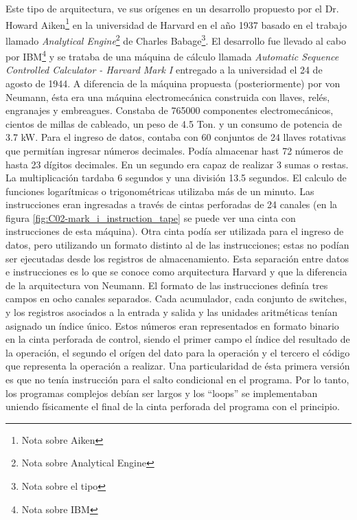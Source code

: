 Este tipo de arquitectura, ve sus orígenes en un desarrollo propuesto por el Dr. Howard Aiken\footnote{Nota sobre Aiken} en la universidad de Harvard en el año 1937 basado en el trabajo llamado \emph{Analytical Engine}\footnote{Nota sobre Analytical Engine} de Charles Babage\footnote{Nota sobre el tipo}. El desarrollo fue llevado al cabo por IBM\footnote{Nota sobre IBM} y se trataba de una máquina de cálculo llamada \emph{Automatic Sequence Controlled Calculator - Harvard Mark I} entregado a la universidad el 24 de agosto de 1944. A diferencia de la máquina propuesta (posteriormente) por von Neumann, ésta era una máquina electromecánica construida con llaves, relés, engranajes y embreagues. Constaba de 765000 componentes electromecánicos, cientos de millas de cableado, un peso de 4.5 Ton. y un consumo de potencia de 3.7 kW. Para el ingreso de datos, contaba con 60 conjuntos de 24 llaves rotativas que permitían ingresar números decimales. Podía almacenar hast 72 números de hasta 23 dígitos decimales. En un segundo era capaz de realizar 3 sumas o restas. La multiplicación tardaba 6 segundos y una división 13.5 segundos. El calculo de funciones logarítmicas o trigonométricas utilizaba más de un minuto. Las instrucciones eran ingresadas a través de cintas perforadas de 24 canales (en la figura \ref{fig:C02-mark_i_instruction_tape} se puede ver una cinta con instrucciones de esta máquina). Otra cinta podía ser utilizada para el ingreso de datos, pero utilizando un formato distinto al de las instrucciones; estas no podían ser ejecutadas desde los registros de almacenamiento. Esta separación entre datos e instrucciones es lo que se conoce como arquitectura Harvard y que la diferencia de la arquitectura von Neumann. El formato de las instrucciones definía tres campos en ocho canales separados. Cada acumulador, cada conjunto de switches, y los registros asociados a la entrada y salida y las unidades aritméticas tenían asignado un índice único. Estos números eran representados en formato binario en la cinta perforada de control, siendo el primer campo el índice del resultado de la operación, el segundo el orígen del dato para la operación y el tercero el código que representa la operación a realizar. Una particularidad de ésta primera versión es que no tenía instrucción para el salto condicional en el programa. Por lo tanto, los programas complejos debían ser largos y los ``loops'' se implementaban uniendo físicamente el final de la cinta perforada del programa con el principio.\\
